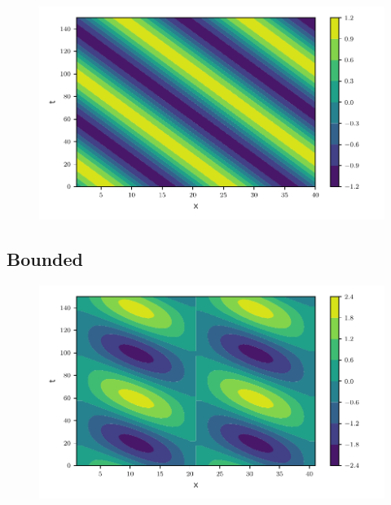 \begin{figure}[htp]
  \centering
  \includegraphics[width=\textwidth]{../figures/psi_periodic_centered_short.pdf}
  \caption{}
  \label{fig:periodic_sine}
\end{figure}


\subsection{Bounded}

\begin{figure}[htp]
  \centering
  \includegraphics[width=\textwidth]{../figures/psi_bounded_centered_sine.pdf}
  \caption{}
  \label{fig:bounded_sine}
\end{figure}


